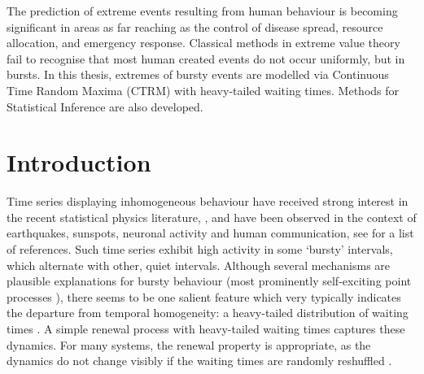 \documentclass[honours,12pt]{unswthesis}
\newcommand{\1}{\mathbf 1}
\newcommand\blankpage{%
    \null
    \thispagestyle{empty}%
    \addtocounter{page}{-1}%
    \newpage}
\numberwithin{equation}{section}
\theoremstyle{definition}
\theoremstyle{remark}
\begin{document}


The prediction of extreme events resulting from human
behaviour is becoming significant in areas as far reaching as the
control of disease spread, resource allocation, and emergency
response.  Classical methods in extreme value theory fail to recognise
that most human created events do not occur uniformly, but in bursts.
In this thesis, 
extremes of bursty events are modelled via Continuous Time Random Maxima
(CTRM) with heavy-tailed waiting times.  Methods for Statistical Inference
are also developed. 

\afterpage{\blankpage}


\afterpreface

%
%

\afterpage{\blankpage}

\chapter{Introduction}\label{s-intro}
Time series displaying inhomogeneous behaviour have received strong interest in 
the recent statistical physics literature,
\cite{Barabasi2005,Oliveira2005,Vasquez2006,Vazquez2007,Omi2011,
Min2010,Karsai2011,Bagrow2013},
and have been observed in the context of earthquakes, sunspots, neuronal
activity and human communication, see \cite{Karsai2012,Vajna2013} for a 
list of references.
Such time series exhibit high activity in some `bursty' intervals, which 
alternate with other, quiet intervals.  Although several mechanisms are 
plausible explanations for bursty behaviour
(most prominently self-exciting point processes \cite{hawkes1971point}),
there seems to be one salient
feature which very typically indicates the departure from temporal homogeneity: 
a heavy-tailed distribution of waiting times
\cite{Vasquez2006,Karsai2012,Vajna2013}. 
A simple renewal process with heavy-tailed waiting times captures these
dynamics. For many systems, the renewal property is appropriate, as the dynamics do not change visibly if the
waiting times are randomly reshuffled \cite{Karsai2012}.
\end{document}
